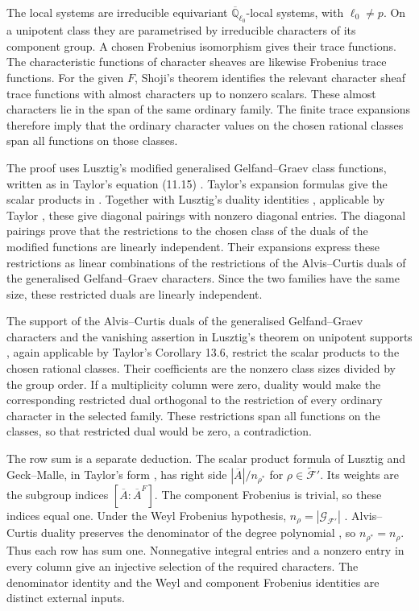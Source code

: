 The local systems are irreducible equivariant
$\overline{\mathbb Q}_{\ell_0}$-local systems, with $\ell_0\ne p$.
On a unipotent class they are parametrised by irreducible characters
of its component group. A chosen Frobenius isomorphism gives their
trace functions. The characteristic functions of character sheaves
are likewise Frobenius trace functions. For the given $F$, Shoji's
theorem \cite[Theorem~3.2]{Shoji1995II} identifies the relevant
character sheaf trace functions with almost characters up to nonzero scalars.
These almost characters lie in the span of the same ordinary family.
The finite trace expansions therefore imply that the ordinary character
values on the chosen rational classes span all functions on those classes.

The proof uses Lusztig's modified generalised Gelfand--Graev class functions, written as
in Taylor's equation (11.15) \cite{Taylor2016}.
Taylor's expansion formulas \cite[Theorem~11.13 and Lemma~11.16]{Taylor2016}
give the scalar products in
\cite[Lemma~3.5 and Corollary~3.6]{Geck1994BasicIII}. Together with
Lusztig's duality identities
\cite[Proposition~8.5 and Corollary~8.6]{Lusztig1992Support},
applicable by Taylor \cite[Corollary~13.6]{Taylor2016}, these give
diagonal pairings with nonzero diagonal entries. The diagonal pairings prove that the restrictions to the chosen class of the duals of the modified functions are linearly independent. Their expansions express these restrictions as linear combinations of the restrictions of the Alvis--Curtis duals of the generalised Gelfand--Graev characters. Since the two families have the same size, these restricted duals are linearly independent.

The support of the Alvis--Curtis duals of the generalised Gelfand--Graev characters and the vanishing assertion in Lusztig's
theorem on unipotent supports
\cite[Theorem~11.2(iv)]{Lusztig1992Support}, again applicable by
Taylor's Corollary 13.6, restrict the scalar products to the chosen
rational classes. Their coefficients are the nonzero class sizes
divided by the group order. If a multiplicity column were zero, duality would make the corresponding restricted dual orthogonal to the restriction of every ordinary character in the selected family. These restrictions span all functions on the classes, so that restricted dual would be zero, a contradiction.

The row sum is a separate deduction. The scalar product formula of
Lusztig and Geck--Malle, in Taylor's form
\cite[Proposition~15.4 and Lemma~14.15]{Taylor2016}, has right side
$|\overline A|/n_{\rho^*}$ for
$\rho\in\widetilde{\mathcal F}'$. Its weights are the subgroup indices
$[\overline A:\overline A^F]$. The component Frobenius is trivial,
so these indices equal one. Under the Weyl Frobenius hypothesis,
$n_\rho=|\mathcal G_{\mathcal F'}|$
\cite[(6.1)(c)]{Geck1999GGGR}. Alvis--Curtis duality preserves the
denominator of the degree polynomial
\cite[Proposition~3.4.21]{GeckMalle2020}, so $n_{\rho^*}=n_\rho$.
Thus each row has sum one. Nonnegative integral entries and a nonzero
entry in every column give an injective selection of the required
characters. The denominator identity and the Weyl and component
Frobenius identities are distinct external inputs.

